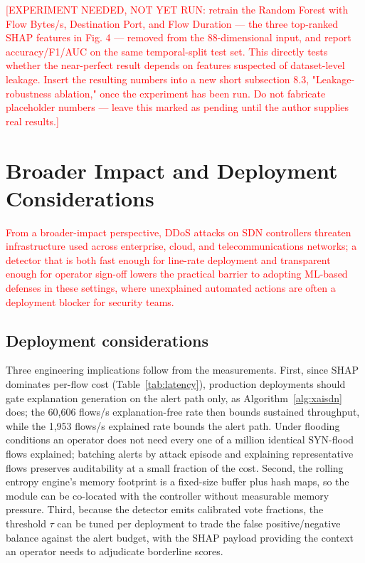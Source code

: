\documentclass{ieeeaccess}
\begin{document}
\textcolor{red}{[EXPERIMENT NEEDED, NOT YET RUN: retrain the Random Forest with Flow Bytes/s, Destination Port, and Flow Duration — the three top-ranked SHAP features in Fig. 4 — removed from the 88-dimensional input, and report accuracy/F1/AUC on the same temporal-split test set. This directly tests whether the near-perfect result depends on features suspected of dataset-level leakage. Insert the resulting numbers into a new short subsection 8.3, "Leakage-robustness ablation," once the experiment has been run. Do not fabricate placeholder numbers — leave this marked as pending until the author supplies real results.]}

\section{Broader Impact and Deployment Considerations}
\label{sec:discussion}

\textcolor{red}{From a broader-impact perspective, DDoS attacks on SDN controllers threaten infrastructure used across enterprise, cloud, and telecommunications networks; a detector that is both fast enough for line-rate deployment and transparent enough for operator sign-off lowers the practical barrier to adopting ML-based defenses in these settings, where unexplained automated actions are often a deployment blocker for security teams.}

\subsection{Deployment considerations}
Three engineering implications follow from the measurements. First, since SHAP dominates per-flow cost (Table~\ref{tab:latency}), production deployments should gate explanation generation on the alert path only, as Algorithm~\ref{alg:xaisdn} does; the 60,606 flows/s explanation-free rate then bounds sustained throughput, while the 1,953 flows/s explained rate bounds the alert path. Under flooding conditions an operator does not need every one of a million identical SYN-flood flows explained; batching alerts by attack episode and explaining representative flows preserves auditability at a small fraction of the cost. Second, the rolling entropy engine's memory footprint is a fixed-size buffer plus hash maps, so the module can be co-located with the controller without measurable memory pressure. Third, because the detector emits calibrated vote fractions, the threshold $\tau$ can be tuned per deployment to trade the false positive/negative balance against the alert budget, with the SHAP payload providing the context an operator needs to adjudicate borderline scores.
\end{document}
